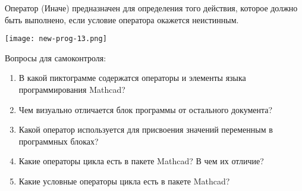 Оператор  (Иначе) предназначен для определения того действия, которое должно быть выполнено, если условие оператора  окажется неистинным.


\begin{center}
	\texttt{[image: new-prog-13.png]}
\end{center}


Вопросы для самоконтроля:
\begin{enumerate}
	\item В какой пиктограмме содержатся операторы и элементы языка программирования Mathcad?
	\item Чем визуально отличается блок программы от остального документа?
	\item Какой оператор используется для присвоения значений переменным в программных блоках?
	\item Какие операторы цикла есть в пакете Mathcad? В чем их отличие?
	\item Какие условные операторы цикла есть в пакете Mathcad?
\end{enumerate}
